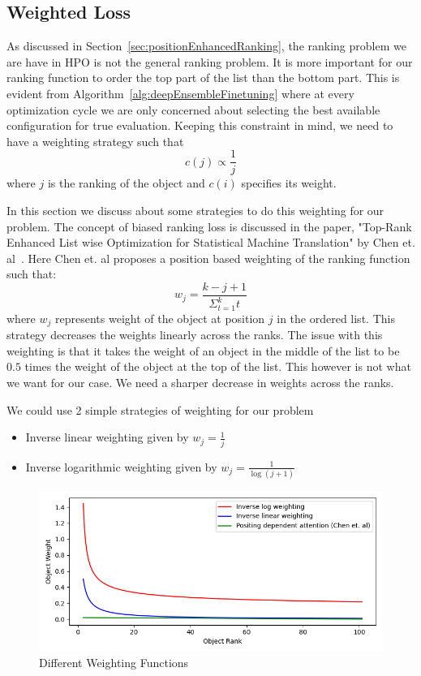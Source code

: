 \documentclass[12pt, twoside, ngerman]{report}
\begin{document}
\subsection{Weighted Loss}
As discussed in Section~\ref{sec:positionEnhancedRanking},  the ranking problem we are have in HPO is not the general ranking problem.
It is more important for our ranking function to order the top part of the list than the bottom part.
This is evident from Algorithm~\ref{alg:deepEnsembleFinetuning} where at every optimization cycle we are only concerned about selecting the best available configuration for true evaluation.
Keeping this constraint in mind,  we need to have a weighting strategy such that
$$
c(j) \propto \frac{1}{j}
$$
where $j$ is the ranking of the object and $c(i)$ specifies its weight.

In this section we discuss about some strategies to do this weighting for our problem.
The concept of biased ranking loss is discussed in the paper, "Top-Rank Enhanced List wise Optimization for Statistical Machine Translation" by  Chen et. al~\cite{TRLWO}.
Here Chen et. al proposes a position based weighting of the ranking function such that:
\begin{equation}
w_j = \frac{k - j + 1}{\Sigma_{t=1}^k t}
\end{equation}
where $w_j$ represents weight of the object at position $j$ in the ordered list.
This strategy decreases the weights linearly across the ranks.
The issue with this weighting is that it takes the weight of an object in the middle of the list to be $0.5$ times the weight of the object at the top of the list.
This however is not what we want for our case.
We need a sharper decrease in weights across the ranks.

We could use 2 simple strategies of weighting for our problem
\begin{itemize}
\item Inverse linear weighting given by $w_j = \frac{1}{j}$
\item Inverse logarithmic weighting given by $w_j = \frac{1}{\log (j+1)}$
\end{itemize}

\begin{figure}[htb]
  \centering
    \includegraphics[scale=0.65]{images/weightingfunctions}
    \caption{Different Weighting Functions}
    \label{fig:weightingfunctions}
\end{figure}
\end{document}
